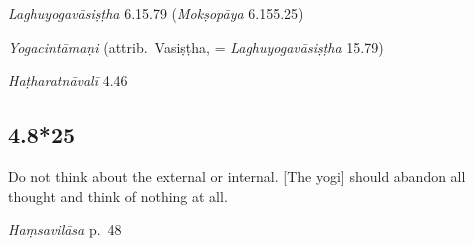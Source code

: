 \begin{ekdosis}
\begin{sources}[hp04_008_24]
\emph{Laghuyogavāsiṣṭha} 6.15.79 (\emph{Mokṣopāya} 6.155.25)
\begin{versinnote}
\end{versinnote}
\end{sources}

\begin{testimonia}[hp04_008_24]
\emph{Yogacintāmaṇi} (attrib.~Vasiṣṭha, = \emph{Laghuyogavāsiṣṭha} 15.79)
\begin{versinnote}
\end{versinnote}

\emph{Haṭharatnāvalī} 4.46
\begin{versinnote}
\end{versinnote}
\end{testimonia}


\subsection*{4.8*25}
\begin{translation}[hp04_008_25]
Do not think about the external or internal. [The yogi] should abandon all thought and think of nothing at all.
\end{translation}


\begin{testimonia}[hp04_008_25]
\emph{Haṃsavilāsa} p.~48
\begin{versinnote}
\end{versinnote}
\end{testimonia}


\end{ekdosis}
